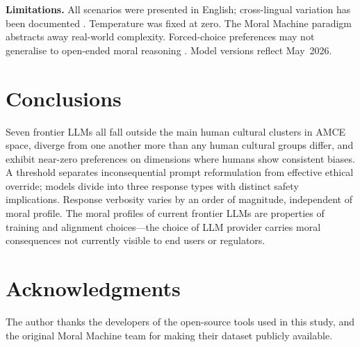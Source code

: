 \documentclass[10pt,letterpaper]{article}
\begin{document}
\begin{linenumbers}
\textbf{Limitations.}
All scenarios were presented in English; cross-lingual variation has been documented
\cite{vida2024,jin2024}. Temperature was fixed at zero. The Moral Machine paradigm
abstracts away real-world complexity. Forced-choice preferences may not generalise
to open-ended moral reasoning \cite{liang2023}. Model versions reflect May~2026.

\section*{Conclusions}

Seven frontier LLMs all fall outside the main human cultural clusters in AMCE
space, diverge from one another more than any human cultural groups differ, and
exhibit near-zero preferences on dimensions where humans show consistent biases. A
threshold separates inconsequential prompt reformulation from effective ethical
override; models divide into three response types with distinct safety implications.
Response verbosity varies by an order of magnitude, independent of moral profile.
The moral profiles of current frontier LLMs are properties of training and
alignment choices---the choice of LLM provider carries moral consequences not
currently visible to end users or regulators.

\section*{Acknowledgments}

The author thanks the developers of the open-source tools used in this study, and
the original Moral Machine team for making their dataset publicly available.



\end{linenumbers}
\end{document}
